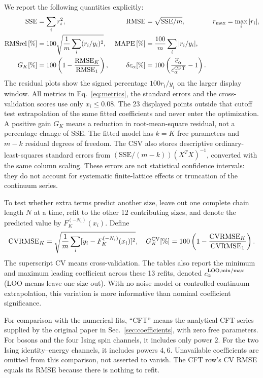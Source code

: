 We report the following quantities explicitly:
\begin{align}
 \mathrm{SSE}&=\sum_i r_i^2,
 &\mathrm{RMSE}&=\sqrt{\mathrm{SSE}/m},
 &r_{\max}&=\max_i|r_i|,\notag\\
 \mathrm{RMSrel}\,[\%]&=100\sqrt{\frac1m\sum_i(r_i/y_i)^2},
 &\mathrm{MAPE}\,[\%]&=\frac{100}m\sum_i|r_i/y_i|,\notag\\
 G_K[\%]&=100\left(1-\frac{\mathrm{RMSE}_K}{\mathrm{RMSE}_1}\right),
 &\delta c_\alpha[\%]&=100\left(\frac{\widehat c_\alpha}{c_\alpha^{\rm CFT}}-1\right).
 \label{eq:metrics}
\end{align}
The residual plots show the signed percentage $100r_i/y_i$ on the
larger display window. All metrics in Eq.~\eqref{eq:metrics}, the
standard errors and the cross-validation scores use only $x_i\leq0.08$.
The 23 displayed points outside that cutoff test extrapolation of the
same fitted coefficients and never enter the optimization.
A positive gain $G_K$ means a reduction in root-mean-square residual, not
a percentage change of SSE. The fitted model has $k=K$ free parameters
and $m-k$ residual degrees of freedom. The CSV also stores descriptive
ordinary-least-squares standard errors from
$(\mathrm{SSE}/(m-k))(X^TX)^{-1}$, converted with the same column scaling.
These errors are not statistical confidence intervals: they do not account
for systematic finite-lattice effects or truncation of the continuum series.

To test whether extra terms predict another size, leave out one complete
chain length $N$ at a time, refit to the other 12 contributing sizes, and denote the
predicted value by $F_K^{(-N_i)}(x_i)$. Define
\begin{equation}
 \mathrm{CVRMSE}_K=\sqrt{\frac1m\sum_i
 [y_i-F_K^{(-N_i)}(x_i)]^2},\quad
 G_K^{\rm CV}[\%]=100\left(1-\frac{\mathrm{CVRMSE}_K}{\mathrm{CVRMSE}_1}\right).
 \label{eq:cv}
\end{equation}
The superscript CV means cross-validation. The tables also report the
minimum and maximum leading coefficient across these 13 refits, denoted
$c_\alpha^{\rm LOO,min/max}$ (LOO means leave one size out).
With no noise model or controlled continuum extrapolation, this variation is more
informative than nominal coefficient significance.

For comparison with the numerical fits, ``CFT'' means the analytical CFT
series supplied by the original paper in Sec.~\ref{sec:coefficients},
with zero free parameters. For bosons and the four Ising spin channels,
it includes only power $2$. For the two Ising identity--energy channels,
it includes powers $4,6$. Unavailable coefficients are omitted from this
comparison, not asserted to vanish.
The CFT row's CV RMSE equals its RMSE because there is nothing to refit.

